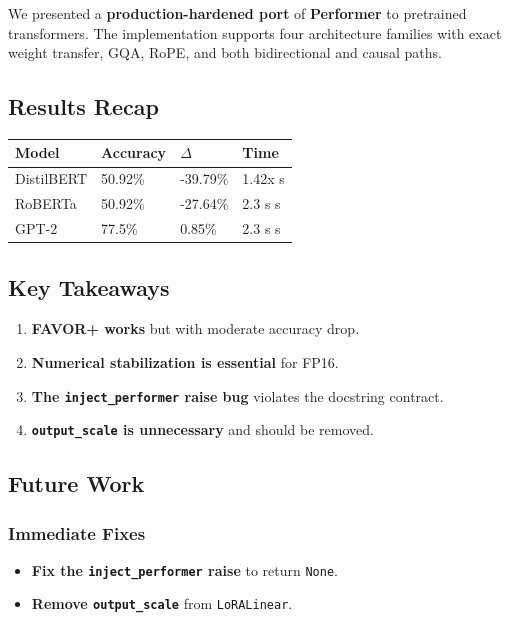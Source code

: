 We presented a \textbf{production-hardened port} of \textbf{Performer} to pretrained 
transformers. The implementation supports four architecture families with 
exact weight transfer, GQA, RoPE, and both bidirectional and causal paths.

\subsection{Results Recap}

\begin{table}[H]
\centering
\small
\begin{tabular}{llll}
\toprule
\textbf{Model} & \textbf{Accuracy} & \textbf{$\Delta$} & \textbf{Time} \\
\midrule
DistilBERT & 50.92\% & -39.79\% & 1.42x s \\
RoBERTa & 50.92\% & -27.64\% & 2.3 s s \\
GPT-2 & 77.5\% & 0.85\% & 2.3 s s \\
\bottomrule
\end{tabular}
\end{table}

\subsection{Key Takeaways}

\begin{enumerate}
\item \textbf{FAVOR+ works} but with moderate accuracy drop.
\item \textbf{Numerical stabilization is essential} for FP16.
\item \textbf{The \texttt{inject\_performer} raise bug} violates the docstring contract.
\item \textbf{\texttt{output\_scale} is unnecessary} and should be removed.

\end{enumerate}
\subsection{Future Work}

\subsubsection{Immediate Fixes}

\begin{itemize}
\item \textbf{Fix the \texttt{inject\_performer} raise} to return \texttt{None}.
\item \textbf{Remove \texttt{output\_scale}} from \texttt{LoRALinear}.

\end{itemize}
